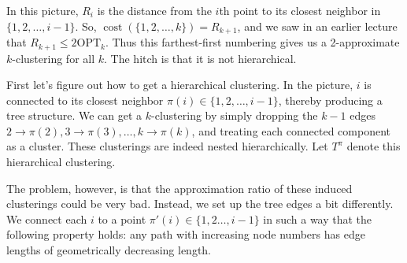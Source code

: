 \documentclass{article}
\begin{document}

In this picture, $R_{i}$ is the distance from the $i$th point to its closest neighbor in $\{1, 2, \ldots, i-1\}$. So, $\operatorname{cost}(\{1, 2, \ldots, k\}) = R_{k+1}$, and we saw in an earlier lecture that $R_{k+1} \leq 2 \mathrm{OPT}_{k}$. Thus this farthest-first numbering gives us a 2-approximate $k$-clustering for all $k$. The hitch is that it is not hierarchical.

First let's figure out how to get a hierarchical clustering. In the picture, $i$ is connected to its closest neighbor $\pi(i) \in \{1, 2, \ldots, i-1\}$, thereby producing a tree structure. We can get a $k$-clustering by simply dropping the $k-1$ edges $2 \rightarrow \pi(2), 3 \rightarrow \pi(3), \ldots, k \rightarrow \pi(k)$, and treating each connected component as a cluster. These clusterings are indeed nested hierarchically. Let $T^{\pi}$ denote this hierarchical clustering.

The problem, however, is that the approximation ratio of these induced clusterings could be very bad. Instead, we set up the tree edges a bit differently. We connect each $i$ to a point $\pi'(i) \in \{1, 2 \ldots, i-1\}$ in such a way that the following property holds: any path with increasing node numbers has edge lengths of geometrically decreasing length.
\end{document}
